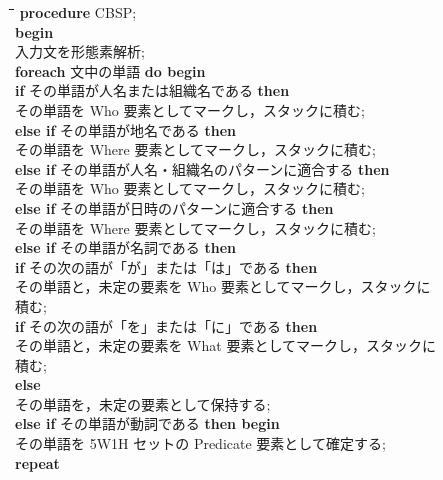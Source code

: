 \begin{figure}[ptb]
  \begin{center}
    \begin{tabbing}
      \hspace*{1em}\=\hspace{1em}\=\hspace{1em}\=\hspace{1em}\=
      \hspace{1em}\=\hspace{1em}\=\hspace{1em}\=\kill
      {\bf procedure} CBSP;\\
      {\bf begin}\+\\
      入力文を形態素解析;\\
      {\bf foreach} 文中の単語 {\bf do begin}\+\\
      {\bf if} その単語が人名または組織名である {\bf then}\+\\
      その単語を Who 要素としてマークし，スタックに積む;\-\\
      {\bf else if} その単語が地名である {\bf then}\+\\
      その単語を Where 要素としてマークし，スタックに積む;\-\\
      {\bf else if} その単語が人名・組織名のパターンに適合する {\bf then}\+\\
      その単語を Who 要素としてマークし，スタックに積む;\-\\
      {\bf else if} その単語が日時のパターンに適合する {\bf then}\+\\
      その単語を Where 要素としてマークし，スタックに積む;\-\\
      {\bf else if} その単語が名詞である {\bf then}\+\\
      {\bf if} その次の語が「が」または「は」である {\bf then}\+\\
      その単語と，未定の要素を Who 要素としてマークし，スタックに積む;\-\\
      {\bf if} その次の語が「を」または「に」である {\bf then}\+\\
      その単語と，未定の要素を What 要素としてマークし，スタックに積む;\-\\
      {\bf else}\+\\
      その単語を，未定の要素として保持する;\-\-\\
      {\bf else if} その単語が動詞である {\bf then begin}\+\\
      その単語を 5W1H セットの Predicate 要素として確定する;\\
      {\bf repeat}\+\\

\end{tabbing}
\end{center}
\end{figure}
